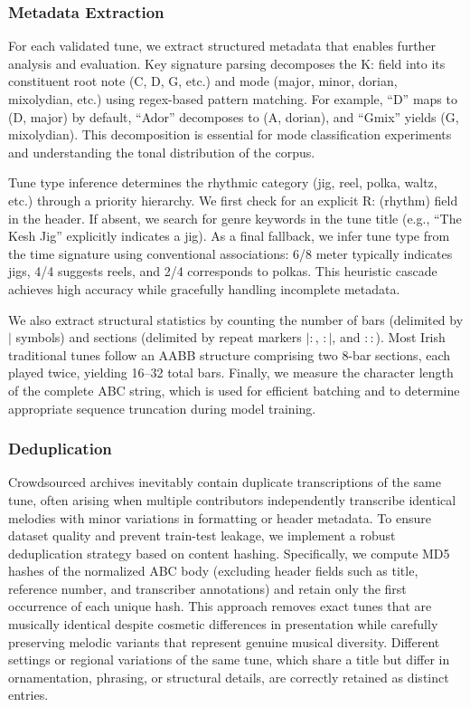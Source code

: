 \documentclass[]{interact}
\theoremstyle{plain}
\theoremstyle{definition}
\theoremstyle{remark}
\begin{document}
\subsubsection{Metadata Extraction}
For each validated tune, we extract structured metadata that enables further analysis and evaluation. Key signature parsing decomposes the K: field into its constituent root note (C, D, G, etc.) and mode (major, minor, dorian, mixolydian, etc.) using regex-based pattern matching. For example, ``D'' maps to (D, major) by default, ``Ador'' decomposes to (A, dorian), and ``Gmix'' yields (G, mixolydian). This decomposition is essential for mode classification experiments and understanding the tonal distribution of the corpus.

Tune type inference determines the rhythmic category (jig, reel, polka, waltz, etc.) through a priority hierarchy. We first check for an explicit R: (rhythm) field in the header. If absent, we search for genre keywords in the tune title (e.g., ``The Kesh Jig'' explicitly indicates a jig). As a final fallback, we infer tune type from the time signature using conventional associations: 6/8 meter typically indicates jigs, 4/4 suggests reels, and 2/4 corresponds to polkas. This heuristic cascade achieves high accuracy while gracefully handling incomplete metadata.

We also extract structural statistics by counting the number of bars (delimited by $|$ symbols) and sections (delimited by repeat markers $|:$, $:|$, and $::$). Most Irish traditional tunes follow an AABB structure comprising two 8-bar sections, each played twice, yielding 16--32 total bars. Finally, we measure the character length of the complete ABC string, which is used for efficient batching and to determine appropriate sequence truncation during model training.

\subsubsection{Deduplication}
Crowdsourced archives inevitably contain duplicate transcriptions of the same tune, often arising when multiple contributors independently transcribe identical melodies with minor variations in formatting or header metadata. To ensure dataset quality and prevent train-test leakage, we implement a robust deduplication strategy based on content hashing. Specifically, we compute MD5 hashes of the normalized ABC body (excluding header fields such as title, reference number, and transcriber annotations) and retain only the first occurrence of each unique hash. This approach removes exact tunes that are musically identical despite cosmetic differences in presentation while carefully preserving melodic variants that represent genuine musical diversity. Different settings or regional variations of the same tune, which share a title but differ in ornamentation, phrasing, or structural details, are correctly retained as distinct entries.
\end{document}
